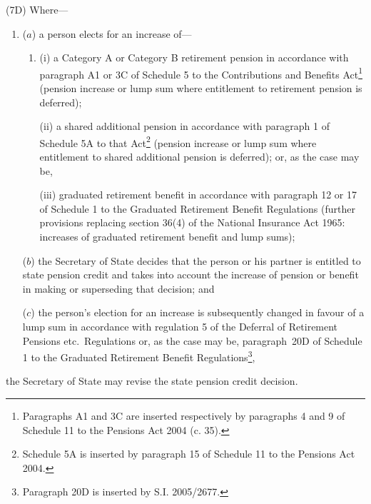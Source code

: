\documentclass[12pt,a4paper]{article}
\begin{document}
(7D) Where—
\begin{enumerate}\item[]
($a$) a person elects for an increase of—
\begin{enumerate}\item[]
(i) a Category A or Category B retirement pension in accordance with paragraph A1 or 3C of Schedule 5 to the Contributions and Benefits Act\footnote{Paragraphs A1 and 3C are inserted respectively by paragraphs 4 and 9 of Schedule 11 to the Pensions Act 2004 (c. 35).} (pension increase or lump sum where entitlement to retirement pension is deferred);

(ii) a shared additional pension in accordance with paragraph 1 of Schedule 5A to that Act\footnote{Schedule 5A is inserted by paragraph 15 of Schedule 11 to the Pensions Act 2004.} (pension increase or lump sum where entitlement to shared additional pension is deferred); or, as the case may be,

(iii) graduated retirement benefit in accordance with paragraph 12 or 17 of Schedule 1 to the Graduated Retirement Benefit Regulations (further provisions replacing section 36(4) of the National Insurance Act 1965: increases of graduated retirement benefit and lump sums);\end{enumerate}

($b$) the Secretary of State decides that the person or his partner is entitled to state pension credit and takes into account the increase of pension or benefit in making or superseding that decision; and

($c$) the person’s election for an increase is subsequently changed in favour of a lump sum in accordance with regulation 5 of the Deferral of Retirement Pensions etc.\ Regulations or, as the case may be, paragraph~20D of Schedule 1 to the Graduated Retirement Benefit Regulations\footnote{Paragraph 20D is inserted by S.I. 2005/2677.},
\end{enumerate}
the Secretary of State may revise the state pension credit decision.
\end{document}
